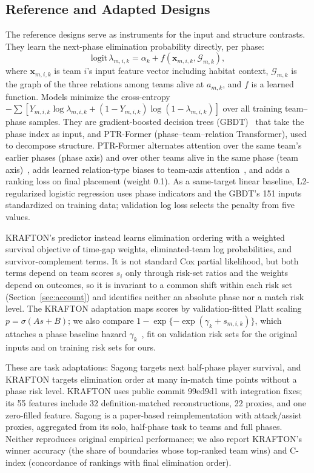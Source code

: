 \documentclass[sigconf,anonymous,nonacm]{acmart}
\begin{document}
\subsection{Reference and Adapted Designs}
\label{sec:method:rq2}
The reference designs serve as instruments for the input and structure contrasts. They learn the next-phase elimination probability directly, per phase:
\begin{equation}
\mathrm{logit}\,\lambda_{m,i,k}=\alpha_k+f(\mathbf{x}_{m,i,k},\mathcal{G}_{m,k}),
\label{eq:logit}
\end{equation}
where $\mathbf{x}_{m,i,k}$ is team $i$'s input feature vector including habitat context, $\mathcal{G}_{m,k}$ is the graph of the three relations among teams alive at $a_{m,k}$, and $f$ is a learned function.
Models minimize the cross-entropy $-\sum[Y_{m,i,k}\log\lambda_{m,i,k}+(1-Y_{m,i,k})\log(1-\lambda_{m,i,k})]$ over all training team--phase samples.
They are gradient-boosted decision trees (GBDT)~\cite{Friedman01} that take the phase index as input, and PTR-Former (phase--team--relation Transformer), used to decompose structure.
PTR-Former alternates attention over the same team's earlier phases (phase axis) and over other teams alive in the same phase (team axis)~\cite{Vaswani17,Ngiam22}, adds learned relation-type biases to team-axis attention~\cite{Ying21}, and adds a ranking loss on final placement (weight 0.1). As a same-target linear baseline, L2-regularized logistic regression uses phase indicators and the GBDT's 151 inputs standardized on training data; validation log loss selects the penalty from five values.

KRAFTON's predictor instead learns elimination ordering with a weighted survival objective of time-gap weights, eliminated-team log probabilities, and survivor-complement terms. It is not standard Cox partial likelihood, but both terms depend on team scores $s_i$ only through risk-set ratios and the weights depend on outcomes, so it is invariant to a common shift within each risk set (Section~\ref{sec:account}) and identifies neither an absolute phase nor a match risk level. The KRAFTON adaptation maps scores by validation-fitted Platt scaling $p=\sigma(A s+B)$; we also compare $1-\exp\{-\exp(\gamma_k+s_{m,i,k})\}$, which attaches a phase baseline hazard $\gamma_k$~\cite{PrenticeGloeckler78}, fit on validation risk sets for the original inputs and on training risk sets for ours.

These are task adaptations: Sagong targets next half-phase player survival, and KRAFTON targets elimination order at many in-match time points without a phase risk level. KRAFTON uses public commit 99ed9d1 with integration fixes; its 55 features include 32 definition-matched reconstructions, 22 proxies, and one zero-filled feature. Sagong is a paper-based reimplementation with attack/assist proxies, aggregated from its solo, half-phase task to teams and full phases. Neither reproduces original empirical performance; we also report KRAFTON's winner accuracy (the share of boundaries whose top-ranked team wins) and C-index (concordance of rankings with final elimination order).
\end{document}
